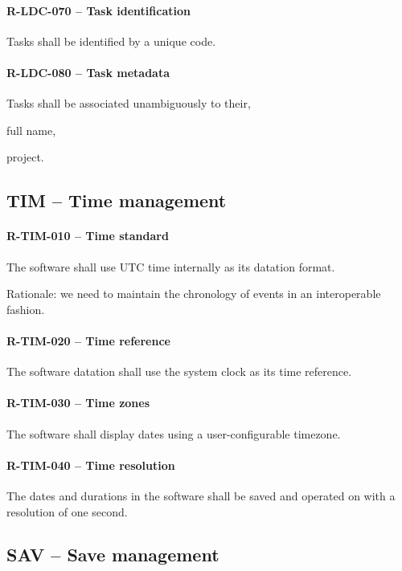 \paragraph{R-LDC-070 -- Task identification}
Tasks shall be identified by a unique code.

\paragraph{R-LDC-080 -- Task metadata}
Tasks shall be associated unambiguously to their,
\begin{compactitem}
  \item full name,
  \item project.
\end{compactitem}

\subsection{TIM -- Time management}
\paragraph{R-TIM-010 -- Time standard}
The software shall use UTC time internally as its datation format.

Rationale: we need to maintain the chronology of events in an interoperable
fashion.

\paragraph{R-TIM-020 -- Time reference}
The software datation shall use the system clock as its time reference.

\paragraph{R-TIM-030 -- Time zones}
The software shall display dates using a user-configurable timezone.

\paragraph{R-TIM-040 -- Time resolution}
The dates and durations in the software shall be saved and operated
on with a resolution of one second.

\subsection{SAV -- Save management}
